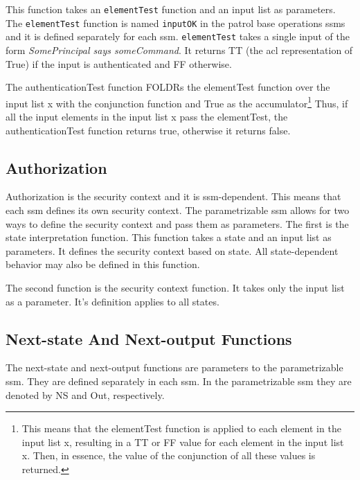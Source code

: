 \documentclass[../../main/main.tex]{subfiles}
\begin{document}
This function takes an \texttt{elementTest} function and an input list as parameters.  The \texttt{elementTest} function is named \texttt{inputOK} in the patrol base operations \glspl{ssm} and it is defined separately for each \gls{ssm}.  \texttt{elementTest} takes a single input of the form \textit{SomePrincipal says someCommand}.  It returns TT (the \gls{acl} representation of True) if the input is authenticated and FF otherwise.  

The authenticationTest function FOLDRs the elementTest function over the input list x with the conjunction function and True as the accumulator\footnote{This means that the elementTest function is applied to each element in the input list x, resulting in a TT or FF value for each element in the input list x.   Then, in essence, the value of the conjunction of all these values is returned.}  Thus, if all the input elements in the input list x pass the elementTest, the authenticationTest function returns true, otherwise it returns false.  
     
\subsection{Authorization}
Authorization is the security context and it is \gls{ssm}-dependent. This means that each \gls{ssm} defines its own security context.  The parametrizable \gls{ssm} allows for two ways to define the security context and pass them as parameters.  The first is the state interpretation function. This function takes a state and an input list as parameters.  It defines the security context based on state.  All state-dependent behavior may also be defined in this function.

The second function is the security context function.  It takes only the input list as a parameter.  It's definition applies to all states.

\subsection{Next-state And Next-output Functions}
The next-state and next-output functions are parameters to the parametrizable \gls{ssm}.  They are defined separately in each \gls{ssm}.  In the parametrizable \gls{ssm} they are denoted by NS and Out, respectively.
\end{document}

